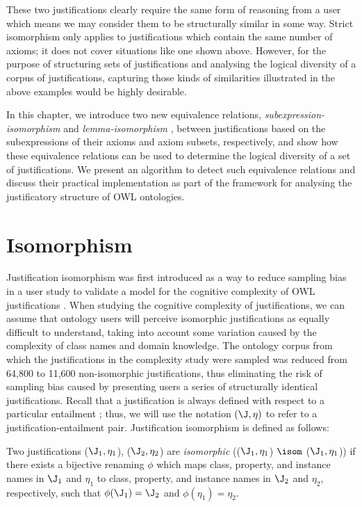 These two justifications clearly require the same form of reasoning from a user which means we may consider them to be structurally similar in some way. Strict isomorphism only applies to justifications which contain the same number of axioms; it does not cover situations like one shown above. However, for the purpose of structuring sets of justifications and analysing the logical diversity of a corpus of justifications, capturing those kinds of similarities illustrated in the above examples would be highly desirable. 

In this chapter, we introduce two new equivalence relations, \emph{subexpression-isomorphism} \sisom and \emph{lemma-isomorphism} \lisom,  between justifications based on the subexpressions of their axioms and axiom subsets, respectively, and show how these equivalence relations can be used to determine the logical diversity of a set of justifications. We present an algorithm to detect such equivalence relations and discuss their practical implementation as part of the framework for analysing the justificatory structure of OWL ontologies.


\section{Isomorphism}

Justification isomorphism was first introduced as a way to reduce sampling bias in a user study to validate a model for the cognitive complexity of OWL justifications \cite{horridge11gj}. When studying the cognitive complexity of justifications, we can assume that ontology users will perceive isomorphic justifications as equally difficult to understand, taking into account some variation caused by the complexity of class names and domain knowledge. The ontology corpus from which the justifications in the complexity study \cite{horridge11gj} were sampled was reduced from 64,800 to 11,600 non-isomorphic justifications, thus eliminating the risk of sampling bias caused by presenting users a series of structurally identical justifications. Recall that a justification \J is always defined with respect to a particular entailment \ent; thus, we will use the notation $(\J, \eta)$ to refer to a justification-entailment pair. Justification isomorphism is defined as follows:

\begin{defn}
Two justifications ($\J_{1},\eta_{1}$), ($\J_{2},\eta_{2}$) are \emph{isomorphic} (($\J_{1},\eta_{1}$) $\isom$ ($\J_{1},\eta_{1}$)) if there exists a bijective renaming $\phi$ which maps class, property, and instance names in $\J_{1}$ and $\eta_{1}$ to class, property, and instance names in $\J_{2}$ and $ \eta_{2}$, respectively, such that $\phi(\J_{1}) = \J_{2}$ and $\phi(\eta_{1}) = \eta_{2}$. 
\end{defn}
